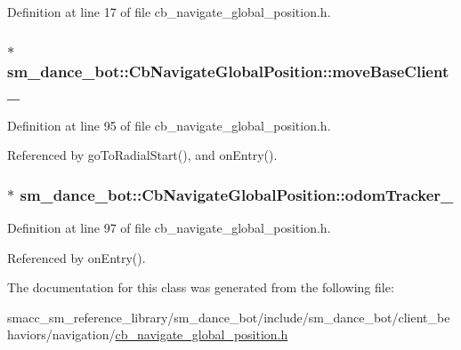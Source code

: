 Definition at line 17 of file cb\+\_\+navigate\+\_\+global\+\_\+position.\+h.

\subsubsection[{\texorpdfstring{move\+Base\+Client\+\_\+}{moveBaseClient_}}]{$\ast$ sm\+\_\+dance\+\_\+bot\+::\+Cb\+Navigate\+Global\+Position\+::move\+Base\+Client\+\_\+\hspace{0.3cm}{\ttfamily [private]}}\hypertarget{classsm__dance__bot_1_1CbNavigateGlobalPosition_acaea61e5bdf69018d945f6c7025acfc0}{}\label{classsm__dance__bot_1_1CbNavigateGlobalPosition_acaea61e5bdf69018d945f6c7025acfc0}


Definition at line 95 of file cb\+\_\+navigate\+\_\+global\+\_\+position.\+h.



Referenced by go\+To\+Radial\+Start(), and on\+Entry().

\subsubsection[{\texorpdfstring{odom\+Tracker\+\_\+}{odomTracker_}}]{$\ast$ sm\+\_\+dance\+\_\+bot\+::\+Cb\+Navigate\+Global\+Position\+::odom\+Tracker\+\_\+\hspace{0.3cm}{\ttfamily [private]}}\hypertarget{classsm__dance__bot_1_1CbNavigateGlobalPosition_a1d9fbebe8579cdef9485698e99ca8a41}{}\label{classsm__dance__bot_1_1CbNavigateGlobalPosition_a1d9fbebe8579cdef9485698e99ca8a41}


Definition at line 97 of file cb\+\_\+navigate\+\_\+global\+\_\+position.\+h.



Referenced by on\+Entry().



The documentation for this class was generated from the following file\+:\begin{DoxyCompactItemize}
\item 
smacc\+\_\+sm\+\_\+reference\+\_\+library/sm\+\_\+dance\+\_\+bot/include/sm\+\_\+dance\+\_\+bot/client\+\_\+behaviors/navigation/\hyperlink{cb__navigate__global__position_8h}{cb\+\_\+navigate\+\_\+global\+\_\+position.\+h}\end{DoxyCompactItemize}
